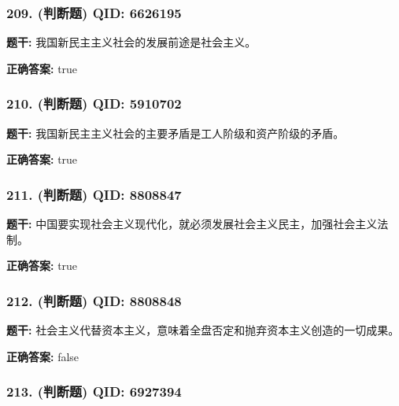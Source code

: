 \documentclass[12pt,UTF8]{ctexart}
\begin{document}
\subsubsection*{209. (判断题) \small QID: 6626195}

\textbf{题干:}
我国新民主主义社会的发展前途是社会主义。

\textbf{正确答案:}
true

\vspace{0.3em}\hrulefill\vspace{0.7em}

\subsubsection*{210. (判断题) \small QID: 5910702}

\textbf{题干:}
我国新民主主义社会的主要矛盾是工人阶级和资产阶级的矛盾。

\textbf{正确答案:}
true

\vspace{0.3em}\hrulefill\vspace{0.7em}

\subsubsection*{211. (判断题) \small QID: 8808847}

\textbf{题干:}
中国要实现社会主义现代化，就必须发展社会主义民主，加强社会主义法制。

\textbf{正确答案:}
true

\vspace{0.3em}\hrulefill\vspace{0.7em}

\subsubsection*{212. (判断题) \small QID: 8808848}

\textbf{题干:}
社会主义代替资本主义，意味着全盘否定和抛弃资本主义创造的一切成果。

\textbf{正确答案:}
false

\vspace{0.3em}\hrulefill\vspace{0.7em}

\subsubsection*{213. (判断题) \small QID: 6927394}
\end{document}
